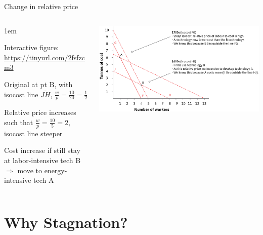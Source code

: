 \documentclass[11pt,aspectratio=43,usenames,dvipsnames]{beamer}
\newcommand{\blue}[1]{\textcolor{blue}{#1}}
\let\olditemize=\itemize
\let\endolditemize=\enditemize
\renewenvironment{itemize}{\olditemize \itemsep1em}{\endolditemize}
\theoremstyle{definition}
\begin{document}
\begin{frame}{Change in relative price}
\label{slide:Change_in_relative_price}
    \begin{columns}
        \begin{column}{0.4\textwidth}
            \begin{itemize}
                \small
                \item Interactive figure: \blue{\url{https://tinyurl.com/2fsfzcm3}}
                \item Original at pt B, with isocost line $\overline{JH}$,  $ \displaystyle  \frac{w}{p} = \frac{10}{20} = \frac{1}{2} $
                \item Relative price increases such that $ \displaystyle \frac{w}{p} = \frac{10}{5} = 2 $, isocost line steeper
                \item Cost increase if still stay at labor-intensive tech B $ \Rightarrow  $ move to energy-intensive tech A
            \end{itemize}
        \end{column}
        \begin{column}{0.6\textwidth}
            \includegraphics[width=\textwidth]{./figures/Figure2_12.png}
        \end{column}
    \end{columns}
\end{frame}

\section[Stagnation?]{Why Stagnation?}
\label{sec:Why_Stagnation_}
\end{document}
